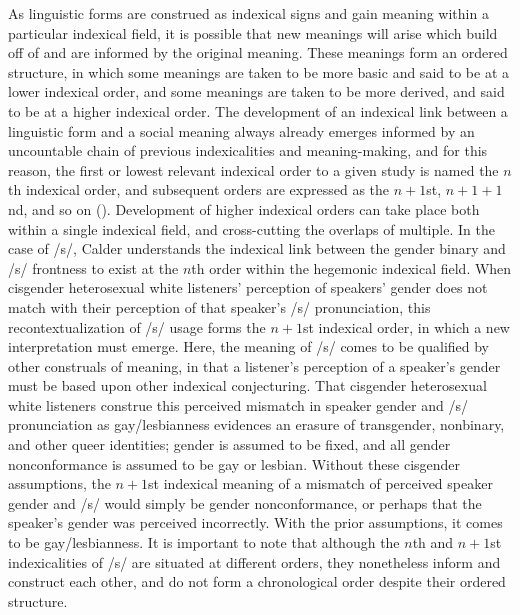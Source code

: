 \documentclass[12pt,twoside]{reedthesis}
\begin{document}
As linguistic forms are construed as indexical signs and gain meaning within a particular indexical field, it is possible that new meanings will arise which build off of and are informed by the original meaning. These meanings form an ordered structure, in which some meanings are taken to be more basic and said to be at a lower indexical order, and some meanings are taken to be more derived, and said to be at a higher indexical order. The development of an indexical link between a linguistic form and a social meaning always already emerges informed by an uncountable chain of previous indexicalities and meaning-making, and for this reason, the first or lowest relevant indexical order to a given study is named the $n$th indexical order, and subsequent orders are expressed as the $n + 1$st, $n + 1 + 1$nd, and so on (\cite{silverstein_indexical_2003}). Development of higher indexical orders can take place both within a single indexical field, and cross-cutting the overlaps of multiple. In the case of /s/, Calder understands the indexical link between the gender binary and /s/ frontness to exist at the $n$th order within the hegemonic indexical field. When cisgender heterosexual white listeners' perception of speakers' gender does not match with their perception of that speaker's /s/ pronunciation, this recontextualization of /s/ usage forms the $n + 1$st indexical order, in which a new interpretation must emerge. Here, the meaning of /s/ comes to be qualified by other construals of meaning, in that a listener's perception of a speaker's gender must be based upon other indexical conjecturing. That cisgender heterosexual white listeners construe this perceived mismatch in speaker gender and /s/ pronunciation as gay/lesbianness evidences an erasure of transgender, nonbinary, and other queer identities; gender is assumed to be fixed, and all gender nonconformance is assumed to be gay or lesbian. Without these cisgender assumptions, the $n + 1$st indexical meaning of a mismatch of perceived speaker gender and /s/ would simply be gender nonconformance, or perhaps that the speaker's gender was perceived incorrectly. With the prior assumptions, it comes to be gay/lesbianness. It is important to note that although the $n$th and $n + 1$st indexicalities of /s/ are situated at different orders, they nonetheless inform and construct each other, and do not form a chronological order despite their ordered structure.
	
\end{document}
